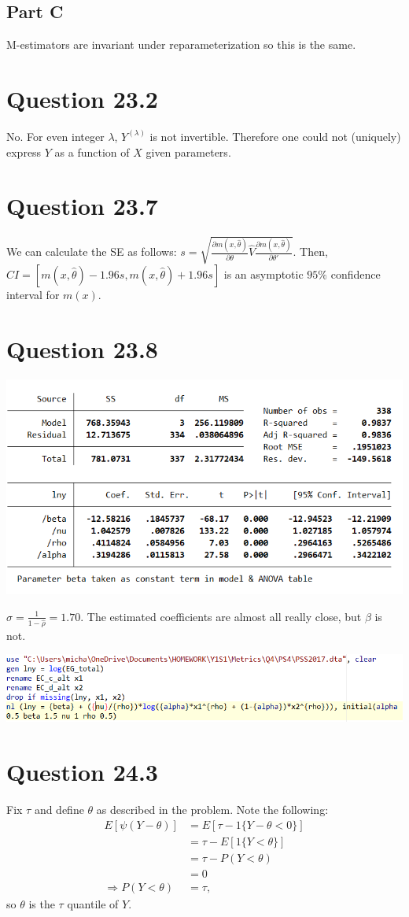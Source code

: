 \documentclass[11pt]{article} %
\begin{document}
\subsection{Part C}
M-estimators are invariant under reparameterization so this is the same.
\section{Question 23.2}
No. For even integer $\lambda$, $Y^{(\lambda)}$ is not invertible. Therefore one could not (uniquely) express $Y$ as a function of $X$ given parameters.
\section{Question 23.7}
We can calculate the SE as follows: $s=\sqrt{\frac{\partial m (x,\hat{\theta})}{\partial \theta} \hat{V} \frac{\partial m (x,\hat{\theta})}{\partial \theta'} }$. Then, \\$CI = [m(x,\hat{\theta})-1.96s,m(x,\hat{\theta})+1.96s]$ is an asymptotic $95\%$ confidence interval for $m(x).$
\section{Question 23.8} %

\includegraphics{p1}

$\hat{\sigma} = \frac{1}{1-\hat{\rho}} = 1.70.$ The estimated coefficients are almost all really close, but $\beta$ is not.

\includegraphics{p2}

\section{Question 24.3}
Fix $\tau$ and define $\theta$ as described in the problem. Note the following:
\begin{align*}
E[\psi(Y-\theta)] &= E[\tau - 1\{Y-\theta<0 \}]\\
 &= \tau - E[1\{Y<\theta \}]\\
&= \tau - P(Y<\theta)\\
&= 0\\
\Rightarrow P(Y<\theta) &= \tau,
\end{align*}
so $\theta$ is the $\tau$ quantile of $Y$.
\end{document}
